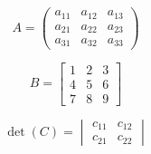 
\begin{equation}
A = \begin{pmatrix}
a_{11} & a_{12} & a_{13} \\
a_{21} & a_{22} & a_{23} \\
a_{31} & a_{32} & a_{33}
\end{pmatrix}
\end{equation}

\begin{equation}
B = \begin{bmatrix}
1 & 2 & 3 \\
4 & 5 & 6 \\
7 & 8 & 9
\end{bmatrix}
\end{equation}

\begin{equation}
\det(C) = \begin{vmatrix}
c_{11} & c_{12} \\
c_{21} & c_{22}
\end{vmatrix}
\end{equation}



